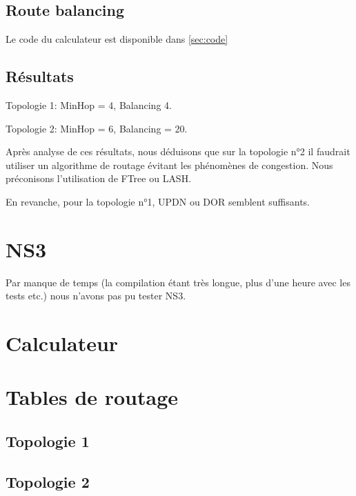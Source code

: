 \documentclass{report}
\begin{document}
			\section{Route balancing}
				Le code du calculateur est disponible dans \autoref{sec:code}
				
			\section{Résultats}
				Topologie 1: MinHop = 4, Balancing  4.
				
				Topologie 2: MinHop = 6, Balancing = 20.
				
				Après analyse de ces résultats, nous déduisons que sur la topologie n°2 il faudrait utiliser un algorithme de routage évitant les phénomènes de congestion. Nous préconisons l'utilisation de FTree ou LASH.
				
				En revanche, pour la topologie n°1, UPDN ou DOR semblent suffisants.
	\chapter{NS3}
		Par manque de temps (la compilation étant très longue, plus d'une heure avec les tests etc.) nous n'avons pas pu tester NS3.
		
		
	\appendix
	\chapter{Calculateur\label{sec:code}}
		
	
	\chapter{Tables de routage\label{sec:routes}}
		\section{Topologie 1}
			
			
		\section{Topologie 2}
			
	
\end{document}
